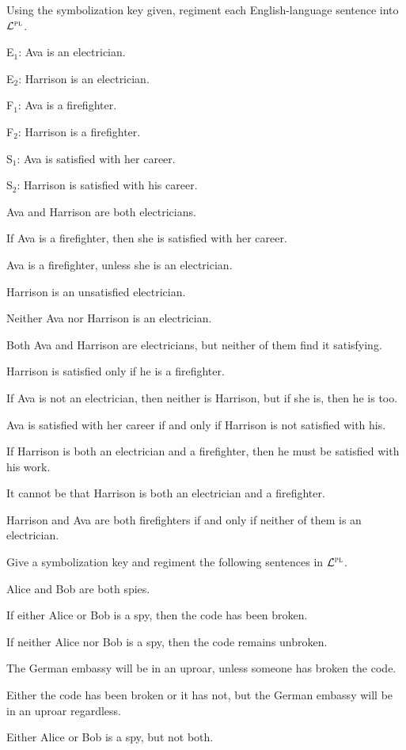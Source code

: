 \solutions
\problempart Using the symbolization key given, regiment each English-language sentence into $\mathcal{L}^{\textsc{pl}}$.
\label{pr.avacareer}
\begin{ekey}
\item[E$_1$:] Ava is an electrician.
\item[E$_2$:] Harrison is an electrician.
\item[F$_1$:] Ava is a firefighter.
\item[F$_2$:] Harrison is a firefighter.
\item[S$_1$:] Ava is satisfied with her career.
\item[S$_2$:] Harrison is satisfied with his career.
\end{ekey}
\begin{earg}
\item Ava and Harrison are both electricians.
\item If Ava is a firefighter, then she is satisfied with her career.
\item Ava is a firefighter, unless she is an electrician.
\item Harrison is an unsatisfied electrician.
\item Neither Ava nor Harrison is an electrician.
\item Both Ava and Harrison are electricians, but neither of them find it satisfying.
\item Harrison is satisfied only if he is a firefighter.
\item If Ava is not an electrician, then neither is Harrison, but if she is, then he is too.
\item Ava is satisfied with her career if and only if Harrison is not satisfied with his.
\item If Harrison is both an electrician and a firefighter, then he must be satisfied with his work.
\item It cannot be that Harrison is both an electrician and a firefighter.
\item Harrison and Ava are both firefighters if and only if neither of them is an electrician.
\end{earg}




\solutions
\problempart
\label{pr.spies}
Give a symbolization key and regiment the following sentences in $\mathcal{L}^{\textsc{pl}}$.
\begin{earg}
\item Alice and Bob are both spies.
\item If either Alice or Bob is a spy, then the code has been broken.
\item If neither Alice nor Bob is a spy, then the code remains unbroken.
\item The German embassy will be in an uproar, unless someone has broken the code.
\item Either the code has been broken or it has not, but the German embassy will be in an uproar regardless.
\item Either Alice or Bob is a spy, but not both.
\end{earg}

